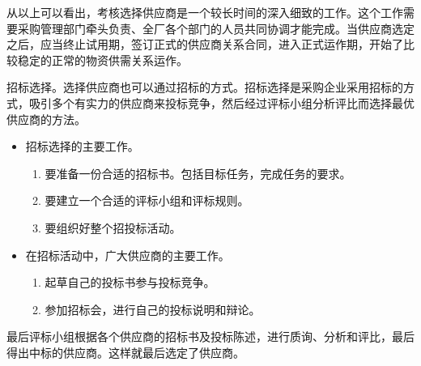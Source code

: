 \begin{enumerate.zh}
    从以上可以看出，考核选择供应商是一个较长时间的深入细致的工作。这个工作需要采购管理部门牵头负责、全厂各个部门的人员共同协调才能完成。当供应商选定之后，应当终止试用期，签订正式的供应商关系合同，进入正式运作期，开始了比较稳定的正常的物资供需关系运作。

    \item 招标选择。选择供应商也可以通过招标的方式。招标选择是采购企业采用招标的方式，吸引多个有实力的供应商来投标竞争，然后经过评标小组分析评比而选择最优供应商的方法。

        \begin{itemize}
            \item  招标选择的主要工作。
                \begin{enumerate}
                    \item 要准备一份合适的招标书。包括目标任务，完成任务的要求。
                    \item 要建立一个合适的评标小组和评标规则。
                    \item 要组织好整个招投标活动。
                \end{enumerate}

            \item  在招标活动中，广大供应商的主要工作。
                \begin{enumerate}
                    \item 起草自己的投标书参与投标竞争。
                    \item 参加招标会，进行自己的投标说明和辩论。
                \end{enumerate}

        \end{itemize}

    最后评标小组根据各个供应商的招标书及投标陈述，进行质询、分析和评比，最后得出中标的供应商。这样就最后选定了供应商。

    \end{enumerate.zh}
